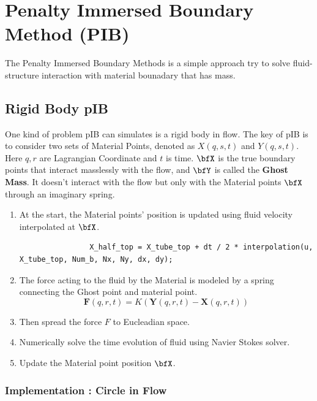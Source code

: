 \documentclass[../Immersed_Boundary_Method.tex]{subfiles}
\begin{document}
\section{Penalty Immersed Boundary Method (PIB)}

The Penalty Immersed Boundary Methods is a simple approach try to solve fluid-structure interaction with material bounadary that has mass. 

\subsection{Rigid Body pIB}
One kind of problem pIB can simulates is a rigid body in flow. The key of pIB is to consider two sets of Material Points, denoted as $X(q,s,t)$ and $Y(q,s,t)$. Here $q,r$ are Lagrangian Coordinate and $t$ is time. $\bfX$ is the true boundary points that interact masslessly with the flow, and $\bfY$ is called the \textbf{Ghost Mass}. It doesn't interact with the flow but only with the Material points $\bfX$ through an imaginary spring. 
\begin{explanation}
    \begin{enumerate}
        \item At the start, the Material points' position is updated using fluid velocity interpolated at $\bfX$. 
        \begin{lstlisting}
                X_half_top = X_tube_top + dt / 2 * interpolation(u, X_tube_top, Num_b, Nx, Ny, dx, dy);
        \end{lstlisting}
        \item The force acting to the fluid by the Material is modeled by a spring connecting the Ghost point and material point. 
        \begin{equation}
            \mathbf{F}(q, r,t)=K(\mathbf{Y}(q, r,t)-\mathbf{X}(q, r, t))
        \end{equation}
        \item Then spread the force $F$ to Eucleadian space. 
        \item Numerically solve the time evolution of fluid using Navier Stokes solver. 
        \item Update the Material point position $\bfX$. 
    \end{enumerate}
\end{explanation}

\subsubsection{Implementation : Circle in Flow}
\end{document}
